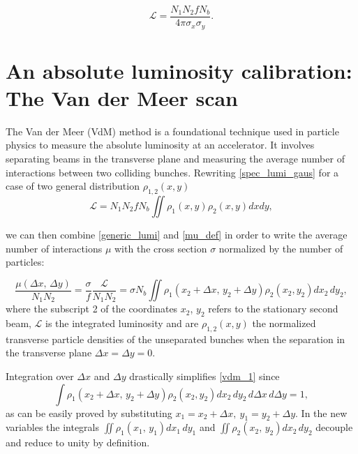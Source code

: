 \begin{equation}
\mathcal{L} = \frac{N_1  N_2  f N_b}{4 \pi  \sigma_x \sigma_y}.
\end{equation}




\section{An absolute luminosity calibration: The Van der Meer scan}
The Van der Meer (VdM) method is a foundational technique used in particle physics to measure the absolute luminosity at an accelerator. It involves separating beams in the transverse plane and measuring the average number of interactions between two colliding bunches. 
Rewriting \ref{spec_lumi_gaus} for a case of two general distribution $\rho_{1,2} (x,y)$
\begin{equation}
    \mathcal{L} = N_1 N_2 f N_b\iint \rho_1(x,y) \rho_2(x,y) dxdy,\label{generic_lumi}
\end{equation}

we can then combine \ref{generic_lumi} and \ref{mu_def} in order to write the average number of interactions $\mu$  with the cross section $\sigma$ normalized by the number of particles:

\begin{equation}
\frac{\mu (\Delta x,\, \Delta y)}{N_1N_2} = \frac{\sigma}{f} \frac{\mathcal{L}}{N_1N_2} = \sigma N_b \iint \rho _1(x_2 + \Delta x,\, y_2 + \Delta y) \rho _2(x_2,y_2) dx_2\, dy_2, \label{vdm_1}
\end{equation}
where the subscript 2 of the coordinates $x_2$, $y_2$ refers to the stationary second beam, $\mathcal{L}$ is the integrated luminosity and are $\rho_{1,2}(x,y)$ the normalized transverse particle densities of the unseparated bunches when the separation in the transverse plane $\Delta x = \Delta y = 0$.

Integration over $\Delta x$ and $\Delta y$ drastically simplifies \eqref{vdm_1} since
\begin{equation} \int \rho _1(x_2 {+} \Delta x,\, y_2 {+} \Delta y) \rho _2(x_2,y_2) dx_2\, dy_2\, d\Delta x\, d\Delta y {=} 1, \label{vdm_2} \end{equation}
as can be easily proved by substituting $x_1=x_2+\Delta x,\ y_1=y_2+\Delta y$. In the new variables the integrals $\iint \rho _1(x_1,\, y_1)dx_1\,dy_1$ and $\iint \rho _2(x_2,\, y_2)dx_2\,dy_2$ decouple and reduce to unity by definition.

